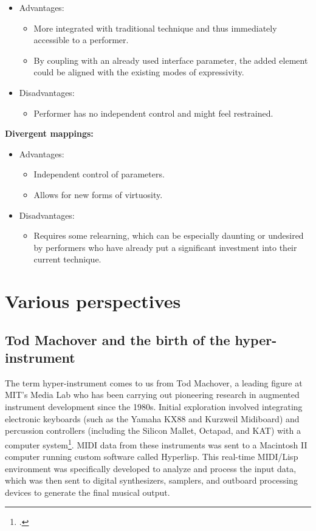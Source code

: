\documentclass[12pt,twoside,maitrise]{dms_ks}
\theoremstyle{definition}
\begin{document}
{\begin{itemize}
  \item Advantages:
  \begin{itemize}
    \item More integrated with traditional technique and thus immediately accessible to a performer.
    \item By coupling with an already used interface parameter, the added element could be aligned with the existing modes of expressivity.
  \end{itemize}
  \item Disadvantages:
  \begin{itemize}
    \item Performer has no independent control and might feel restrained.
  \end{itemize}
\end{itemize}

\textbf{Divergent mappings:}

\begin{itemize}
  \item Advantages:
  \begin{itemize}
    \item Independent control of parameters.
    \item Allows for new forms of virtuosity.
  \end{itemize}
  \item Disadvantages:
  \begin{itemize}
    \item Requires some relearning, which can be especially daunting or undesired by performers who have already put a significant investment into their current technique.
  \end{itemize}
\end{itemize}

\section{Various perspectives}

\subsection{Tod Machover and the birth of the hyper-instrument}

The term hyper-instrument comes to us from Tod Machover, a leading figure at MIT's Media Lab who has been carrying out pioneering research in augmented instrument development since the 1980s. 
Initial exploration involved integrating electronic keyboards (such as the Yamaha KX88 and Kurzweil Midiboard) and percussion controllers (including the Silicon Mallet, Octapad, and KAT) with a computer system\footcite[186]{machover_hyper-instruments_1989}. 
MIDI data from these instruments was sent to a Macintosh II computer running custom software called Hyperlisp.
This real-time MIDI/Lisp environment was specifically developed to analyze and process the input data, which was then sent to digital synthesizers, samplers, and outboard processing devices to generate the final musical output.

}
\end{document}
